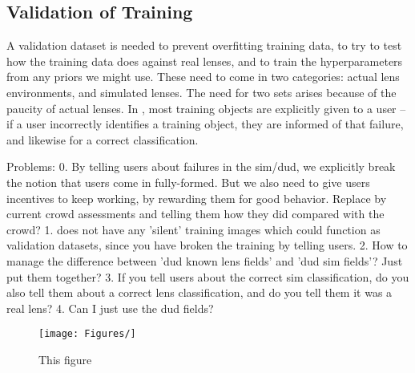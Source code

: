 \documentclass[useAMS,usenatbib,a4paper]{mn2e}
\begin{document}
\subsection{Validation of Training}
\label{sec:validation}


A validation dataset is needed to prevent overfitting training data, to try
to test how the training data does against real lenses, and to train the
hyperparameters from any priors we might use. These need to come in
two categories: actual lens environments, and simulated lenses. The need for
two sets arises because of the paucity of actual lenses. In \SW, most training
objects are explicitly given to a user -- if a user incorrectly identifies a
training object, they are informed of that failure, and likewise for a correct
classification.

Problems:
0. By telling users about failures in the sim/dud, we explicitly break the
notion that users come in fully-formed. But we also need to give users
incentives to keep working, by rewarding them for good behavior. Replace by
current crowd assessments and telling them how they did compared with the
crowd?
1. \SW does not have any 'silent' training images which could function as
validation datasets, since you have broken the training by telling users.
2. How to manage the difference between 'dud known lens fields' and 'dud sim
fields'? Just put them together?
3. If you tell users about the correct sim classification, do you also tell
them about a correct lens classification, and do you tell them it was a real
lens?
4. Can I just use the dud fields?

\begin{figure}
\begin{center}
    \texttt{[image: Figures/]}
\end{center}
\caption{This figure }
\label{fig:validation}
\end{figure}


\end{document}
